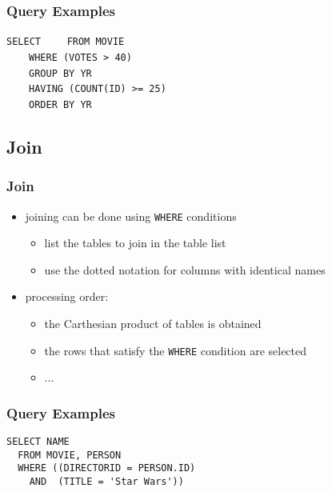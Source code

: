 \documentclass[dvipsnames]{beamer}
\theoremstyle{plain}
\begin{document}
\begin{frame}[fragile]
  \frametitle{Query Examples}

  \begin{example}
\lstinline!SELECT! 
~~~~\lstinline!FROM MOVIE!\\
\pause
~~~~\lstinline!WHERE (VOTES > 40)!\\
\pause
~~~~\lstinline!GROUP BY YR!\\
\pause
~~~~\lstinline!HAVING (COUNT(ID) >= 25)!\\
\pause\pause
~~~~\lstinline!ORDER BY YR!
  \end{example}
\end{frame}

\subsection{Join}

\begin{frame}
  \frametitle{Join}

  \begin{itemize}
    \item joining can be done using \lstinline!WHERE! conditions
    \begin{itemize}
      \item list the tables to join in the table list
      \item use the dotted notation for columns with identical names
    \end{itemize}

    \pause
    \item processing order:
    \begin{itemize}
      \item the Carthesian product of tables is obtained
      \item the rows that satisfy the \lstinline!WHERE! condition are selected
      \item ...
    \end{itemize}
  \end{itemize}
\end{frame}

\begin{frame}[fragile]
  \frametitle{Query Examples}

  \begin{example}
    \begin{lstlisting}
SELECT NAME
  FROM MOVIE, PERSON
  WHERE ((DIRECTORID = PERSON.ID)
    AND  (TITLE = 'Star Wars'))
    \end{lstlisting}
  \end{example}
\end{frame}
\end{document}
